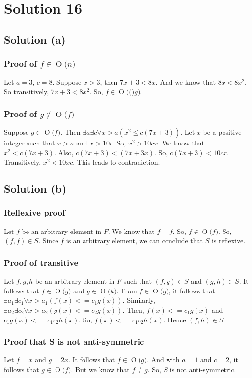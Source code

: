 \documentclass{article}
\newcommand{\BigO}[1]{\ensuremath{\operatorname{O}\bigl(#1\bigr)}}
\begin{document}
\section{Solution 16}
\subsection{Solution (a)}
\subsubsection{Proof of $f \in \BigO{n}$}
Let $a = 3$, $c = 8$. Suppose $x > 3$, then $7x + 3 < 8x$. And we know
that $8x < 8x^2$. So transitively, $7x + 3 < 8x^2$. So, $f \in
\BigO(g)$.

\subsubsection{Proof of $g \notin \BigO{f}$}
Suppose $g \in \BigO{f}$. Then
$\exists a \exists c \forall x > a(x^2 \leq c(7x+3))$. Let $x$ be a
positive integer such that $x > a$ and $x > 10c$. So, $x^2 > 10cx$. We
know that $x^2 < c(7x + 3)$. Also, $c(7x + 3) < (7x + 3x)$. So,
$c(7x + 3) < 10cx$. Transitively, $x^2 < 10xc$. This leads to
contradiction.

\subsection{Solution (b)}
\subsubsection{Reflexive proof}
Let $f$ be an arbitrary element in $F$. We know that $f = f$. So, $f
\in \BigO{f}$. So, $(f,f) \in S$. Since $f$ is an arbitrary element,
we can conclude that $S$ is reflexive.

\subsubsection{Proof of transitive}
Let $f,g,h$ be an arbitrary element in $F$ such that $(f,g) \in S$ and
$(g,h) \in S$. It follows that $f \in \BigO{g}$ and $g \in \BigO{h}$.
From $f \in \BigO{g}$, it follows that $\exists a_1 \exists c_1 \forall
x > a_1(f(x) <= c_1g(x))$. Similarly, $\exists a_2 \exists c_2 \forall
x > a_2(g(x) <= c_2g(x))$. Then, $f(x) <= c_1g(x)$ and $c_1g(x) <=
c_1c_2h(x)$. So, $f(x) <= c_1c_2h(x)$. Hence $(f,h) \in S$.

\subsubsection{Proof that S is not anti-symmetric}
Let $f=x$ and $g=2x$. It follows that $f \in \BigO{g}$. And with $a =
1$ and $c=2$, it follows that $g \in \BigO{f}$. But we know that $f
\neq g$. So, $S$ is not anti-symmetric.
\end{document}
